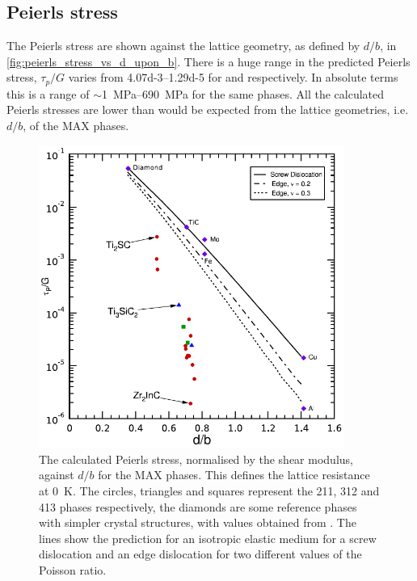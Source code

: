 \FloatBarrier
\subsection{Peierls stress}
\FloatBarrier



The Peierls stress are shown against the lattice geometry, as defined by $d/b$, in \autoref{fig:peierls_stress_vs_d_upon_b}. There is a huge range in the predicted Peierls stress, $\tau_p / G$ varies from \numrange{4.07d-3}{1.29d-5} for  and  respectively. In absolute terms this is a range of $\sim$\SIrange{1}{690}{\mega\pascal} for the same phases. All the calculated Peierls stresses are lower than would be expected from the lattice geometries, i.e. $d/b$, of the MAX phases.



\begin{figure}
\centering
\includegraphics[width=10cm]{tp_vs_d_upon_b}
\captionsetup{width=12cm}
\caption[The calculated Peierls stresses of the MAX phases as a function of lattice geometry.]{The calculated Peierls stress, normalised by the shear modulus, against $d/b$ for the MAX phases. This defines the lattice resistance at \SI{0}{\kelvin}. The circles, triangles and squares represent the 211, 312 and 413 phases respectively, the diamonds are some reference phases with simpler crystal structures, with values obtained from \cite{Clegg2006}. The lines show the prediction for an isotropic elastic medium for a screw dislocation and an edge dislocation for two different values of the Poisson ratio. \label{fig:peierls_stress_vs_d_upon_b}}
\end{figure}


